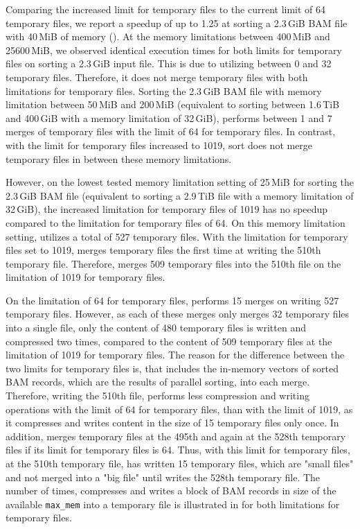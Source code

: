 Comparing the increased limit for temporary files to the current limit of 64 temporary files, we report a speedup of up to 1.25 at sorting a 2.3\,GiB BAM file with 40\,MiB of memory ().
At the memory limitations between 400\,MiB and 25600\,MiB, we observed identical execution times for both limits for temporary files on sorting a 2.3\,GiB input file. This is due to \sort utilizing between 0 and 32 temporary files. Therefore, it does not merge temporary files with both limitations for temporary files.
Sorting the 2.3\,GiB BAM file with memory limitation between 50\,MiB and 200\,MiB (equivalent to sorting between 1.6\,TiB and 400\,GiB with a memory limitation of 32\,GiB), \sort performs between 1 and 7 merges of temporary files with the limit of 64 for temporary files. In contrast, with the limit for temporary files increased to 1019, sort does not merge temporary files in between these memory limitations. 

However, on the lowest tested memory limitation setting of 25\,MiB for sorting the 2.3\,GiB BAM file (equivalent to sorting a 2.9\,TiB file with a memory limitation of 32\,GiB), the increased limitation for temporary files of 1019 has no speedup compared to the limitation for temporary files of 64. On this memory limitation setting, \sort utilizes a total of 527 temporary files. With the limitation for temporary files set to 1019, \sort merges temporary files the first time at writing the 510th temporary file. Therefore, \sort merges 509 temporary files into the 510th file on the limitation of 1019 for temporary files.

On the limitation of 64 for temporary files, \sort performs 15 merges on writing 527 temporary files. However, as each of these merges only merges 32 temporary files into a single file, only the content of 480 temporary files is written and compressed two times, compared to the content of 509 temporary files at the limitation of 1019 for temporary files. The reason for the difference between the two limits for temporary files is, that \sort includes the in-memory vectors of sorted BAM records, which are the results of parallel sorting, into each merge. Therefore, writing the 510th file, \sort performs less compression and writing operations with the limit of 64 for temporary files, than with the limit of 1019, as it compresses and writes content in the size of 15 temporary files only once. In addition, \sort merges temporary files at the 495th and again at the 528th temporary files if its limit for temporary files is 64. Thus, with this limit for temporary files, at the 510th temporary file, \sort has written 15 temporary files, which are "small files" and not merged into a "big file" until \sort writes the 528th temporary file. The number of times, \sort compresses and writes a block of BAM records in size of the available \texttt{max\_mem} into a temporary file is illustrated in  for both limitations for temporary files.

